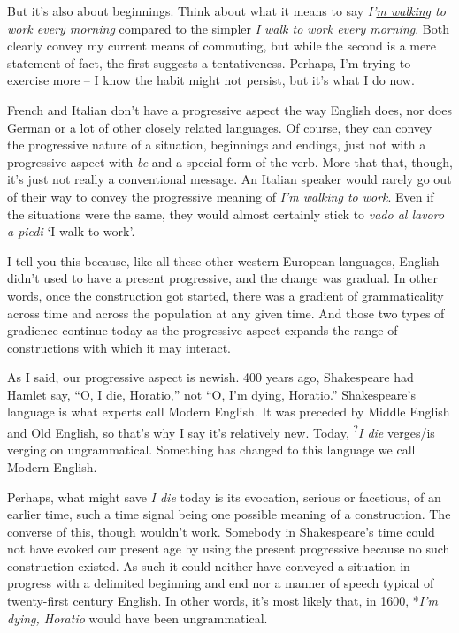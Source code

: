 But it's also about beginnings. Think about what it means to say \textit{I'\uline{m walking} to work every morning} compared to the simpler \textit{I walk to work every morning}. Both clearly convey my current means of commuting, but while the second is a mere statement of fact, the first suggests a tentativeness. Perhaps, I'm trying to exercise more -- I know the habit might not persist, but it's what I do now.

French and Italian don't have a progressive aspect the way English does, nor does German or a lot of other closely related languages. Of course, they can convey the progressive nature of a situation, beginnings and endings, just not with a progressive aspect with \textit{be} and a special form of the verb. More that that, though, it's just not really a conventional message. An Italian speaker would rarely go out of their way to convey the progressive meaning of \textit{I'm walking to work}. Even if the situations were the same, they would almost certainly stick to \textit{vado al lavoro a piedi} `I walk to work'.

\bigskip

I tell you this because, like all these other western European languages, English didn't used to have a present progressive, and the change was gradual. In other words, once the construction got started, there was a gradient of grammaticality across time and across the population at any given time. And those two types of gradience continue today as the progressive aspect expands the range of constructions with which it may interact.

As I said, our progressive aspect is newish. 400 years ago, Shakespeare had Hamlet say, \enquote{O, I die, Horatio,} not \enquote{O, I'm dying, Horatio.} Shakespeare's language is what experts call Modern English. It was preceded by Middle English and Old English, so that's why I say it's relatively new. Today, \textsuperscript{?}\textit{I die} verges/is verging on ungrammatical. Something has changed to this language we call Modern English.

Perhaps, what might save \textit{I die} today is its evocation, serious or facetious, of an earlier time, such a time signal being one possible meaning of a construction. The converse of this, though wouldn't work. Somebody in Shakespeare's time could not have evoked our present age by using the present progressive because no such construction existed. As such it could neither have conveyed a situation in progress with a delimited beginning and end nor a manner of speech typical of twenty-first century English. In other words, it's most likely that, in 1600, *\textit{I'm dying, Horatio} would have been ungrammatical.

